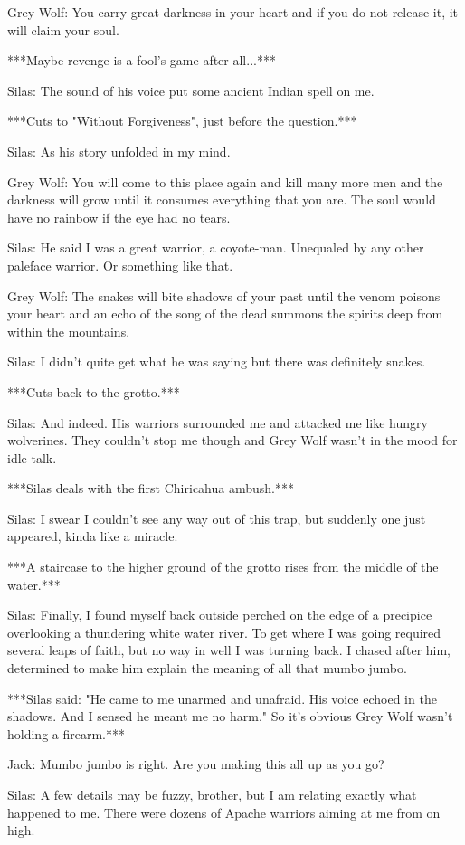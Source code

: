 \documentclass{article}
\begin{document}
Grey Wolf: You carry great darkness in your heart and if you do not release it, it will claim your soul.

***Maybe revenge is a fool's game after all...***

Silas: The sound of his voice put some ancient Indian spell on me.

***Cuts to "Without Forgiveness", just before the question.***

Silas: As his story unfolded in my mind.

Grey Wolf: You will come to this place again and kill many more men and the darkness will grow until it consumes everything that you are. The soul would have no rainbow if the eye had no tears.

Silas: He said I was a great warrior, a coyote-man. Unequaled by any other paleface warrior. Or something like that.

Grey Wolf: The snakes will bite shadows of your past until the venom poisons your heart and an echo of the song of the dead summons the spirits deep from within the mountains.

Silas: I didn't quite get what he was saying but there was definitely snakes.

***Cuts back to the grotto.***

Silas: And indeed. His warriors surrounded me and attacked me like hungry wolverines. They couldn't stop me though and Grey Wolf wasn't in the mood for idle talk.

***Silas deals with the first Chiricahua ambush.***

Silas: I swear I couldn't see any way out of this trap, but suddenly one just appeared, kinda like a miracle.

***A staircase to the higher ground of the grotto rises from the middle of the water.***

Silas: Finally, I found myself back outside perched on the edge of a precipice overlooking a thundering white water river. To get where I was going required several leaps of faith, but no way in well I was turning back. I chased after him, determined to make him explain the meaning of all that mumbo jumbo.

***Silas said: "He came to me unarmed and unafraid. His voice echoed in the shadows. And I sensed he meant me no harm." So it's obvious Grey Wolf wasn't holding a firearm.***

Jack: Mumbo jumbo is right. Are you making this all up as you go?

Silas: A few details may be fuzzy, brother, but I am relating exactly what happened to me. There were dozens of Apache warriors aiming at me from on high.
\end{document}

